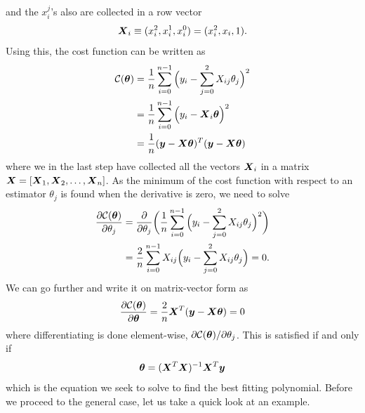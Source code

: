 and the $x_i^j$'s also are collected in a row vector
\begin{equation}
\boldsymbol{{X}}_i\equiv(x_i^2, x_i^1, x_i^0)=(x_i^2, x_i, 1).
\end{equation}
Using this, the cost function can be written as
\begin{equation}
\begin{aligned}
\mathcal{C}(\boldsymbol{{\theta}})&=\frac{1}{n}\sum_{i=0}^{n-1}\Big(y_i-\sum_{j=0}^2X_{ij}\theta_j\Big)^2\\
&=\frac{1}{n}\sum_{i=0}^{n-1}\Big(y_i-\boldsymbol{{X}}_i\boldsymbol{{\theta}}\Big)^2\\
&=\frac{1}{n}(\boldsymbol{{y}}-\boldsymbol{{X}}\boldsymbol{{\theta}})^T(\boldsymbol{{y}}-\boldsymbol{{X}}\boldsymbol{{\theta}})
\end{aligned}
\label{eq:polynomialcost}
\end{equation}
where we in the last step have collected all the vectors $\boldsymbol{{X}}_i$ in a matrix $\boldsymbol{{X}}=[\boldsymbol{{X}}_1,\boldsymbol{{X}}_2,\hdots,\boldsymbol{{X}}_n]$. As the minimum of the cost function with respect to an estimator $\theta_j$ is found when the derivative is zero, we need to solve
\begin{equation}
\begin{aligned}
\frac{\partial \mathcal{C}(\boldsymbol{{\theta}})}{\partial\theta_j} &=\frac{\partial}{\partial\theta_j}\bigg(\frac{1}{n}\sum_{i=0}^{n-1}\Big(y_i-\sum_{j=0}^2X_{ij}\theta_j\Big)^2\bigg)\\
&=\frac{2}{n}\sum_{i=0}^{n-1}X_{ij}\Big(y_i-\sum_{j=0}^2X_{ij}\theta_j\Big)=0.
\end{aligned}
\end{equation}
We can go further and write it on matrix-vector form as
\begin{equation}
\frac{\partial \mathcal{C}(\boldsymbol{{\theta}})}{\partial\boldsymbol{{\theta}}}=\frac{2}{n}\boldsymbol{{X}}^T(\boldsymbol{{y}}-\boldsymbol{{X}}\boldsymbol{{\theta}})=0
\end{equation}
where differentiating is done element-wise, $\partial\mathcal{C(\boldsymbol{{\theta}})}/\partial\theta_j$. This is satisfied if and only if
\begin{equation}
\boldsymbol{{\theta}}=(\boldsymbol{{X}}^T\boldsymbol{{X}})^{-1}\boldsymbol{{X}}^T\boldsymbol{{y}}
\label{eq:polynomialestimators}
\end{equation}
which is the equation we seek to solve to find the best fitting polynomial. Before we proceed to the general case, let us take a quick look at an example.

